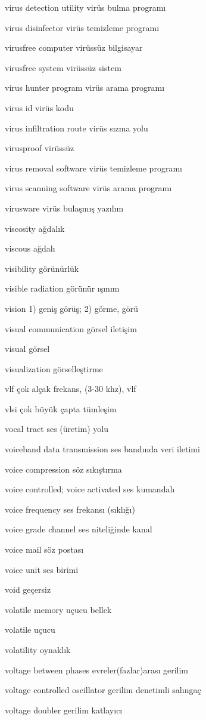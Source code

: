 \documentclass[12pt,fleqn]{article}\usepackage{../../common}
\begin{document}
virus detection utility virüs bulma programı

virus disinfector virüs temizleme programı

virusfree computer virüssüz bilgisayar

virusfree system virüssüz sistem

virus hunter program virüs arama programı

virus id virüs kodu

virus infiltration route virüs sızma yolu

virusproof virüssüz

virus removal software virüs temizleme programı

virus scanning software virüs arama programı

virusware virüs bulaşmış yazılım

viscosity ağdalık

viscous ağdalı

visibility görünürlük

visible radiation görünür ışınım

vision 1) geniş görüş; 2) görme, görü

visual communication görsel iletişim

visual görsel

visualization görselleştirme

vlf çok alçak frekans, (3-30 khz), vlf

vlsi çok büyük çapta tümleşim

vocal tract ses (üretim) yolu

voiceband data transmission ses bandında veri iletimi

voice compression söz sıkıştırma

voice controlled; voice activated ses kumandalı

voice frequency ses frekansı (sıklığı)

voice grade channel ses niteliğinde kanal

voice mail söz postası

voice unit ses birimi

void geçersiz

volatile memory uçucu bellek

volatile uçucu

volatility oynaklık

voltage between phases evreler(fazlar)arası gerilim

voltage controlled oscillator gerilim denetimli salıngaç

voltage doubler gerilim katlayıcı
\end{document}
